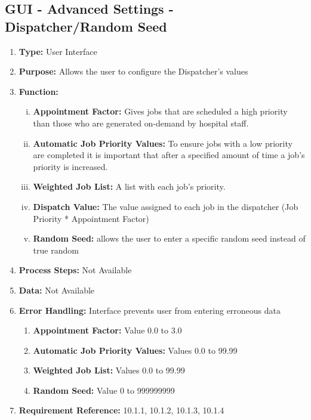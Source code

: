 \documentclass[paper=letter, fontsize=10pt]{scrartcl}
\numberwithin{equation}{section}		%
\numberwithin{figure}{section}			%
\numberwithin{table}{section}				%
\begin{document}
\subsection{GUI - Advanced Settings - Dispatcher/Random Seed}
\begin{enumerate}[]
	\item \textbf{Type:} User Interface
	\item \textbf{Purpose:} Allows the user to configure the Dispatcher's values
	\item \textbf{Function:} 
	\begin{enumerate}[(i)]
		\item \textbf{Appointment Factor:} Gives jobs that are scheduled a high priority than those who are generated on-demand by hospital staff.
		\item \textbf{Automatic Job Priority Values:}  To ensure jobs with a low priority are completed it is important that after a specified amount of time a job's priority is increased.  
		\item \textbf{Weighted Job List:} A list with each job's priority.
		\item \textbf{Dispatch Value:} The value assigned to each job in the dispatcher (Job Priority * Appointment Factor)
		\item \textbf{Random Seed:} allows the user to enter a specific random seed instead of true random
	\end{enumerate}
	\item \textbf{Process Steps:} Not Available
	\item \textbf{Data:} Not Available
	\item \textbf{Error Handling:} Interface prevents user from entering erroneous data 
	\begin{enumerate}[]
		\item \textbf{Appointment Factor:} Value 0.0 to 3.0
		\item \textbf{Automatic Job Priority Values:} Values 0.0 to 99.99
		\item \textbf{Weighted Job List:} Values 0.0 to 99.99
		\item \textbf{Random Seed:} Value 0 to 999999999
	\end{enumerate}
	\item \textbf{Requirement Reference:} 10.1.1, 10.1.2, 10.1.3, 10.1.4
\end{enumerate}
\end{document}
